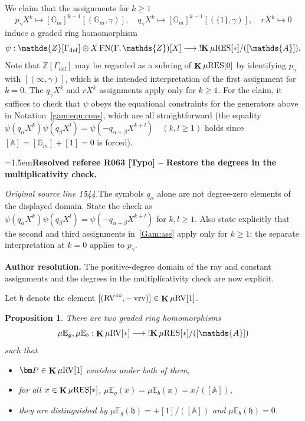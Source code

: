 \documentclass[12pt]{amsart}
\newcommand{\ResolvedRefereeRemark}[5]{%
  \par\medskip\begingroup\normalfont\small\color{gray}%
  \emergencystretch=1.5em\noindent\textbf{Resolved referee R#1 [#2] -- #3.}\par\nobreak\noindent #4\par
  \medskip\color{ResolutionGreen}\noindent\textbf{Author resolution.} #5\par
  \endgroup\medskip
}
\theoremstyle{plain}
\newtheorem{prop}[thm]{Proposition}
\theoremstyle{definition}
\theoremstyle{remark}
\numberwithin{equation}{section}
\theoremstyle{plain}
\newcommand{\RV}{\textup{RV}}
\newcommand{\Z}{\mathds{Z}}
\newcommand{\A}{\mathds{A}}
\newcommand{\G}{\mathds{G}}
\newcommand{\gh}{\mathfrak{h}}
\newcommand{\0}{\emptyset}
\newcommand{\bb}[1]{\mathbb{#1}}
\newcommand{\fun}{\longrightarrow}
\newcommand{\efun}{\longmapsto}
\newcommand{\mgRV}{{\mu}{\RV}}
\newcommand{\RES}{\textup{RES}}
\newcommand{\mgRES}{{\mu}{\RES}}
\newcommand{\mgE}{{\mu}{\bb E}}
\DeclareMathOperator{\ggk}{\mathbf{K}}
\DeclareMathOperator{\sggk}{!\mathbf{K}}
\DeclareMathOperator{\fn}{FN}
\DeclareMathOperator{\vrv}{vrv}
\newcommand{\ccirc}{\circ \circ}
\begin{document}



We claim that the assignments for $k\geq1$
\begin{equation}\label{Gam:ass}
p_\gamma X^k \efun  [\G_m]^{k-1}[(\G_m, \gamma)], \quad q_\gamma X^k \efun  [\G_m]^{k-1}[(\{1\}, \gamma)], \quad r X^k \efun 0
\end{equation}
induce a graded ring homomorphism
\[
\psi : \Z[\Gamma_{\mathrm{def}}] \oplus X\fn(\Gamma, \Z)[X] \fun \sggk \mgRES[*] / ([\A]).
\]
Note that $\Z[\Gamma_{\mathrm{def}}]$ may be regarded as a subring of $\ggk \mgRES[0]$ by identifying $p_\gamma$ with $[(\infty, \gamma)]$, which is the intended interpretation of the first assignment for $k = 0$. The $q_\gamma X^k$ and $rX^k$ assignments apply only for $k\geq1$. For the claim, it suffices to check that $\psi$ obeys the equational constraints for the generators above in Notation~\ref{gam:equ:cons}, which are all straightforward (the equality $\psi(q_\alpha X^k)\psi(q_\beta X^l)=\psi(-q_{\alpha+\beta}X^{k+l})\quad(k,l\geq1)$ holds since $[\A] = [\G_m] +[1] = 0$ is forced).

\ResolvedRefereeRemark{063}{Typo}{Restore the degrees in the multiplicativity check}{%
\textit{Original source line 1544.}\quad The symbols $q_\alpha$ alone are not degree-zero elements of the displayed domain. State the check as $\psi(q_\alpha X^k)\psi(q_\beta X^l)=\psi(-q_{\alpha+\beta}X^{k+l})$ for $k,l\geq1$. Also state explicitly that the second and third assignments in~\eqref{Gam:ass} apply only for $k\geq1$; the separate interpretation at $k=0$ applies to $p_\gamma$.
}{The positive-degree domain of the ray and constant assignments and the degrees in the multiplicativity check are now explicit.}


Let $\gh$ denote the element $[(\RV^{\ccirc},  -\vrv)] \in \ggk \mgRV[1]$.

\begin{prop}\label{prop:eu:retr:k}
There are two graded ring homomorphisms
\[
  \mgE_{g}, \mgE_{b}: \ggk \mgRV[*] \fun   \sggk \mgRES[*] / ([\A])
\]
such that
\begin{itemize}
  \item $\bm P \in \ggk \mgRV[1]$ vanishes under both of them,
  \item for all $x \in \ggk \mgRES[*]$, $\mgE_{g}(x) = \mgE_{b}(x) = x/([\A])$,
  \item they are distinguished by $\mgE_{g}(\gh) = +[1]/([\A])$ and $\mgE_{b}(\gh) = 0$.
\end{itemize}
\end{prop}
\end{document}
